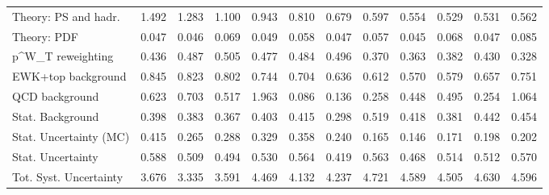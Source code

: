 \begin{tabular}{l|p{0.6cm}p{0.6cm}p{0.6cm}p{0.6cm}p{0.6cm}p{0.6cm}p{0.6cm}p{0.6cm}p{0.6cm}p{0.6cm}p{0.6cm}}
Theory: PS and hadr.                     & 1.492 & 1.283 & 1.100 & 0.943 & 0.810 & 0.679 & 0.597 & 0.554 & 0.529 & 0.531 & 0.562 \\
Theory: PDF                              & 0.047 & 0.046 & 0.069 & 0.049 & 0.058 & 0.047 & 0.057 & 0.045 & 0.068 & 0.047 & 0.085 \\
p^{W}_{T} reweighting                    & 0.436 & 0.487 & 0.505 & 0.477 & 0.484 & 0.496 & 0.370 & 0.363 & 0.382 & 0.430 & 0.328 \\
EWK+top background                       & 0.845 & 0.823 & 0.802 & 0.744 & 0.704 & 0.636 & 0.612 & 0.570 & 0.579 & 0.657 & 0.751 \\
QCD background                           & 0.623 & 0.703 & 0.517 & 1.963 & 0.086 & 0.136 & 0.258 & 0.448 & 0.495 & 0.254 & 1.064 \\
Stat. Background                         & 0.398 & 0.383 & 0.367 & 0.403 & 0.415 & 0.298 & 0.519 & 0.418 & 0.381 & 0.442 & 0.454 \\
Stat. Uncertainty (MC)                   & 0.415 & 0.265 & 0.288 & 0.329 & 0.358 & 0.240 & 0.165 & 0.146 & 0.171 & 0.198 & 0.202 \\
\hline
Stat. Uncertainty                        & 0.588 & 0.509 & 0.494 & 0.530 & 0.564 & 0.419 & 0.563 & 0.468 & 0.514 & 0.512 & 0.570 \\
\hline
Tot. Syst. Uncertainty                   & 3.676 & 3.335 & 3.591 & 4.469 & 4.132 & 4.237 & 4.721 & 4.589 & 4.505 & 4.630 & 4.596 \\
\hline
\end{tabular}

